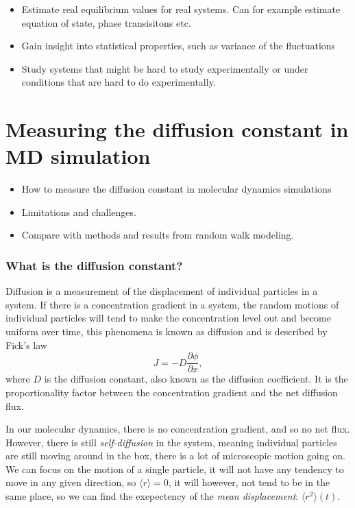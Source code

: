 \documentclass[a4paper, 11pt, notitlepage, english]{article}
\newcommand{\p}{\partial}
\begin{document}
\begin{itemize}
	\item Estimate real equilibrium values for real systems. Can for example estimate equation of state, phase transisitons etc.
	\item Gain insight into statistical properties, such as variance of the fluctuations
	\item Study systems that might be hard to study experimentally or under conditions that are hard to do experimentally.
\end{itemize}

\clearpage


\section{Measuring the diffusion constant in MD simulation}
\begin{itemize}
\item How to measure the diffusion constant in molecular dynamics simulations
\item Limitations and challenges.
\item Compare with methods and results from random walk modeling.
\end{itemize}

\subsubsection*{What is the diffusion constant?}

Diffusion is a measurement of the displacement of individual particles in a system. If there is a concentration gradient in a system, the random motions of individual particles will tend to make the concentration level out and become uniform over time, this phenomena is known as diffusion and is described by Fick's law
$$J = -D\frac{\p \phi}{\p x},$$
where $D$ is the diffusion constant, also known as the diffusion coefficient. It is the proportionality factor between the concentration gradient and the net diffusion flux.

In our molecular dynamics, there is no concentration gradient, and so no net flux. However, there is still \emph{self-diffusion} in the system, meaning individual particles are still moving around in the box, there is a lot of microscopic motion going on. We can focus on the motion of a single particle, it will not have any tendency to move in any given direction, so $\langle r \rangle = 0$, it will however, not tend to be in the same place, so we can find the exepectency of the \emph{mean displacement}: $\langle r^2 \rangle(t)$. 
\end{document}
